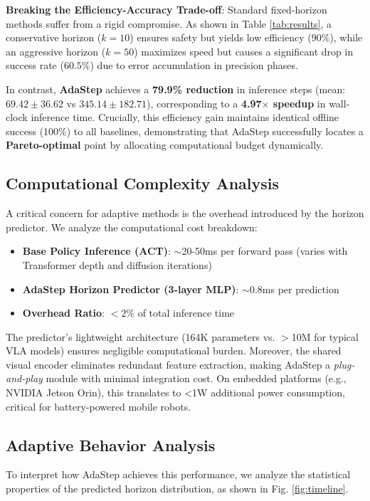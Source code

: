 \documentclass[conference]{IEEEtran}
\begin{document}
\textbf{Breaking the Efficiency-Accuracy Trade-off}: 
Standard fixed-horizon methods suffer from a rigid compromise. As shown in Table \ref{tab:results}, a conservative horizon ($k=10$) ensures safety but yields low efficiency ($90\%$), while an aggressive horizon ($k=50$) maximizes speed but causes a significant drop in success rate ($60.5\%$) due to error accumulation in precision phases.

In contrast, \textbf{AdaStep} achieves a \textbf{79.9\% reduction} in inference steps (mean: $69.42 \pm 36.62$ vs $345.14 \pm 182.71$), corresponding to a \textbf{4.97$\times$ speedup} in wall-clock inference time. Crucially, this efficiency gain maintains identical offline success (100\%) to all baselines, demonstrating that AdaStep successfully locates a \textbf{Pareto-optimal} point by allocating computational budget dynamically.

\subsection{Computational Complexity Analysis}
A critical concern for adaptive methods is the overhead introduced by the horizon predictor. We analyze the computational cost breakdown:

\begin{itemize}
    \item \textbf{Base Policy Inference (ACT)}: $\sim$20-50ms per forward pass (varies with Transformer depth and diffusion iterations)
    \item \textbf{AdaStep Horizon Predictor (3-layer MLP)}: $\sim$0.8ms per prediction
    \item \textbf{Overhead Ratio}: $< 2\%$ of total inference time
\end{itemize}

The predictor's lightweight architecture (164K parameters vs. $>$10M for typical VLA models) ensures negligible computational burden. Moreover, the shared visual encoder eliminates redundant feature extraction, making AdaStep a \emph{plug-and-play} module with minimal integration cost. On embedded platforms (e.g., NVIDIA Jetson Orin), this translates to <1W additional power consumption, critical for battery-powered mobile robots.

\subsection{Adaptive Behavior Analysis}
To interpret how AdaStep achieves this performance, we analyze the statistical properties of the predicted horizon distribution, as shown in Fig. \ref{fig:timeline}.
\end{document}
